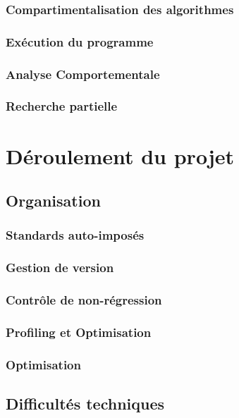 \documentclass[a4paper,10pt]{report}
\begin{document}
\subsection{Compartimentalisation des algorithmes}

\subsection{Exécution du programme}

\subsection{Analyse Comportementale}

\subsection{Recherche partielle}



\chapter{Déroulement du projet}
\section{Organisation}
\subsection{Standards auto-imposés}

\subsection{Gestion de version}

\subsection{Contrôle de non-régression}

\subsection{Profiling et Optimisation}

\subsection{Optimisation}

\section{Difficultés techniques}
\end{document}
